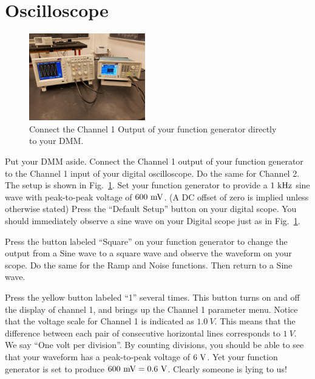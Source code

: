 \section{Oscilloscope}

\begin{figure}[htbp]
\begin{center}
\includegraphics[width=0.45\textwidth]{figs/labs/lissajous/scope_setup.jpg} 
\caption{Connect the Channel 1 Output of your function generator directly to your DMM.}
\label{fig:scope_setup}
\end{center}
\end{figure}

Put your DMM aside.  Connect the Channel 1 output of your function
generator to the Channel 1 input of your digital oscilloscope.  Do the
same for Channel 2.  The setup is shown in Fig.~\ref{fig:scope_setup}.
Set your function generator to provide a $1~\rm kHz$ sine wave with
peak-to-peak voltage of $600~\rm mV$.  (A DC offset of zero is implied
unless otherwise stated) Press the ``Default Setup'' button on your
digital scope.  You should immediately observe a sine wave on your
Digital scope just as in Fig.~\ref{fig:scope_setup}.

Press the button labeled ``Square'' on your function generator to
change the output from a Sine wave to a square wave and observe the
waveform on your scope.  Do the same for the Ramp and
Noise functions.  Then return to a Sine wave.

Press the yellow button labeled ``1'' several times.  This button
turns on and off the display of channel 1, and brings up the Channel 1
parameter menu.  Notice that the voltage scale for Channel 1 is
indicated as $1.0~V$.  This means that the difference between each
pair of consecutive horizontal lines corresponds to $1~V$.  We say
``One volt per division''.  By counting divisions, you should be able
to see that your waveform has a peak-to-peak voltage of $6~\rm V$.
Yet your function generator is set to produce $600~\rm mV = 0.6~\rm
V$.  Clearly someone is lying to us!

